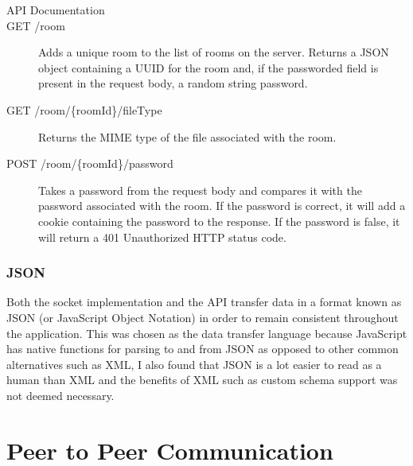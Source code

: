 \documentclass[]{report}
\begin{document}
				\begin{description}
					\item [API Documentation]
				
					\item[GET /room] 
					Adds a unique room to the list of rooms on the server. Returns a JSON object containing a UUID for the room and, if the passworded field is present in the request body, a random string password.
						
					\item[GET /room/\{roomId\}/fileType] 
					Returns the MIME type of the file associated with the room.
					
					\item[POST /room/\{roomId\}/password] 
					Takes a password from the request body and compares it with the password associated with the room. If the password is correct, it will add a cookie containing the password to the response. If the password is false, it will return a 401 Unauthorized HTTP status code.
					
				\end{description}
				
				\subsubsection{JSON}
				Both the socket implementation and the API transfer data in a format known as JSON (or JavaScript Object Notation) in order to remain consistent throughout the application. This was chosen as the data transfer language because JavaScript has native functions for parsing to and from JSON as opposed to other common alternatives such as XML, I also found that JSON is a lot easier to read as a human than XML and the benefits of XML such as custom schema support was not deemed necessary.
		
		\section{Peer to Peer Communication}
\end{document}
